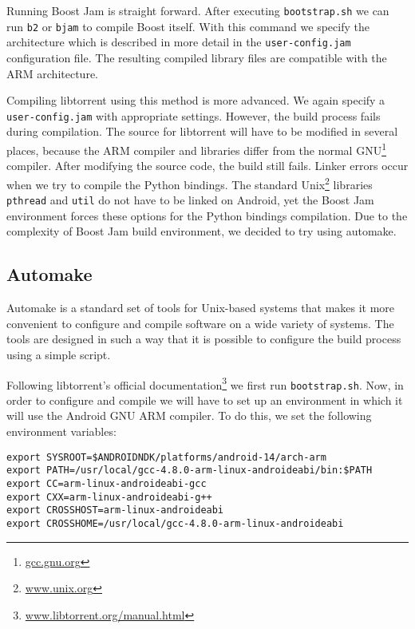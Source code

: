 		Running Boost Jam is straight forward. After executing \texttt{bootstrap.sh} we can run \texttt{b2} or \texttt{bjam} to compile Boost itself. With this command we specify the architecture which is described in more detail in the \texttt{user-config.jam} configuration file. The resulting compiled library files are compatible with the ARM architecture.
		
		Compiling libtorrent using this method is more advanced. We again specify a \texttt{user-config.jam} with appropriate settings. However, the build process fails during compilation. The source for libtorrent will have to be modified in several places, because the ARM compiler and libraries differ from the normal GNU\footnote{\href{http://gcc.gnu.org}{gcc.gnu.org}} compiler. After modifying the source code, the build still fails. Linker errors occur when we try to compile the Python bindings. The standard Unix\footnote{\href{http://www.unix.org}{www.unix.org}} libraries \texttt{pthread} and \texttt{util} do not have to be linked on Android, yet the Boost Jam environment forces these options for the Python bindings compilation. Due to the complexity of Boost Jam build environment, we decided to try using automake.
		
		\subsection{Automake}
		Automake is a standard set of tools for Unix-based systems that makes it more convenient to configure and compile software on a wide variety of systems. The tools are designed in such a way that it is possible to configure the build process using a simple script.
		
		Following libtorrent's official documentation\footnote{\href{http://libtorrent.org/manual.html}{www.libtorrent.org/manual.html}} we first run \texttt{bootstrap.sh}. Now, in order to configure and compile we will have to set up an environment in which it will use the Android GNU ARM compiler. To do this, we set the following environment variables:
		
		\begin{lstlisting}
export SYSROOT=$ANDROIDNDK/platforms/android-14/arch-arm
export PATH=/usr/local/gcc-4.8.0-arm-linux-androideabi/bin:$PATH
export CC=arm-linux-androideabi-gcc
export CXX=arm-linux-androideabi-g++
export CROSSHOST=arm-linux-androideabi
export CROSSHOME=/usr/local/gcc-4.8.0-arm-linux-androideabi
		\end{lstlisting}
		
